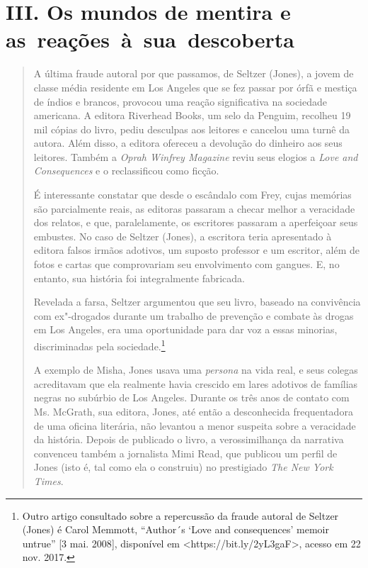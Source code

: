 \section*{III. Os mundos de mentira e as~reações~à~sua~descoberta}

\begin{quote}
A última fraude autoral por que passamos, de Seltzer (Jones), a jovem de
classe média residente em Los Angeles que se fez passar por órfã e
mestiça de índios e brancos, provocou uma reação significativa na
sociedade americana. A editora Riverhead Books, um selo da Penguim,
recolheu 19 mil cópias do livro, pediu desculpas aos leitores e cancelou
uma turnê da autora. Além disso, a editora ofereceu a devolução do
dinheiro aos seus leitores. Também a \emph{Oprah Winfrey Magazine} reviu
seus elogios a \emph{Love and Consequences} e o reclassificou como
ficção.

É interessante constatar que desde o escândalo com Frey, cujas memórias
são parcialmente reais, as editoras passaram a checar melhor a
veracidade dos relatos, e que, paralelamente, os escritores passaram a
aperfeiçoar seus embustes. No caso de Seltzer (Jones), a escritora teria
apresentado à editora falsos irmãos adotivos, um suposto professor e um
escritor, além de fotos e cartas que comprovariam seu envolvimento com
gangues. E, no entanto, sua história foi integralmente fabricada.

Revelada a farsa, Seltzer argumentou que seu livro, baseado na
convivência com ex"-drogados durante um trabalho de prevenção e combate
às drogas em Los Angeles, era uma oportunidade para dar voz a essas
minorias, discriminadas pela sociedade.\footnote{Outro artigo consultado
  sobre a repercussão da fraude autoral de Seltzer (Jones) é Carol
  Memmott, ``Author´s `Love and consequences' memoir untrue'' {[}3 mai.
  2008{]}, disponível em \textless{}https://bit.ly/2yL3gaF\textgreater{}, acesso em 22 nov. 2017.}

A exemplo de Misha, Jones usava uma \emph{persona} na vida real, e seus
colegas acreditavam que ela realmente havia crescido em lares adotivos
de famílias negras no subúrbio de Los Angeles. Durante os três anos de
contato com Ms. McGrath, sua editora, Jones, até então a desconhecida
frequentadora de uma oficina literária, não levantou a menor suspeita
sobre a veracidade da história. Depois de publicado o livro, a
verossimilhança da narrativa convenceu também a jornalista Mimi Read,
que publicou um perfil de Jones (isto é, tal como ela o construiu) no
prestigiado \emph{The New York Times}.


\end{quote}
